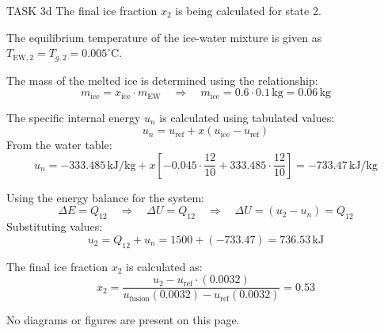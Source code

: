 TASK 3d  
The final ice fraction \( x_2 \) is being calculated for state 2.  

The equilibrium temperature of the ice-water mixture is given as \( T_{\text{EW},2} = T_{g,2} = 0.005^\circ\text{C} \).  

The mass of the melted ice is determined using the relationship:  
\[
m_{\text{ice}} = x_{\text{ice}} \cdot m_{\text{EW}} \quad \Rightarrow \quad m_{\text{ice}} = 0.6 \cdot 0.1 \, \text{kg} = 0.06 \, \text{kg}
\]  

The specific internal energy \( u_n \) is calculated using tabulated values:  
\[
u_n = u_{\text{ref}} + x \left( u_{\text{ice}} - u_{\text{ref}} \right)
\]  
From the water table:  
\[
u_n = -333.485 \, \text{kJ/kg} + x \left[ -0.045 \cdot \frac{12}{10} + 333.485 \cdot \frac{12}{10} \right] = -733.47 \, \text{kJ/kg}
\]  

Using the energy balance for the system:  
\[
\Delta E = Q_{12} \quad \Rightarrow \quad \Delta U = Q_{12} \quad \Rightarrow \quad \Delta U = (u_2 - u_n) = Q_{12}
\]  
Substituting values:  
\[
u_2 = Q_{12} + u_n = 1500 + (-733.47) = 736.53 \, \text{kJ}
\]  

The final ice fraction \( x_2 \) is calculated as:  
\[
x_2 = \frac{u_2 - u_{\text{ref}} \cdot (0.0032)}{u_{\text{fusion}} (0.0032) - u_{\text{ref}} (0.0032)} = 0.53
\]  

No diagrams or figures are present on this page.